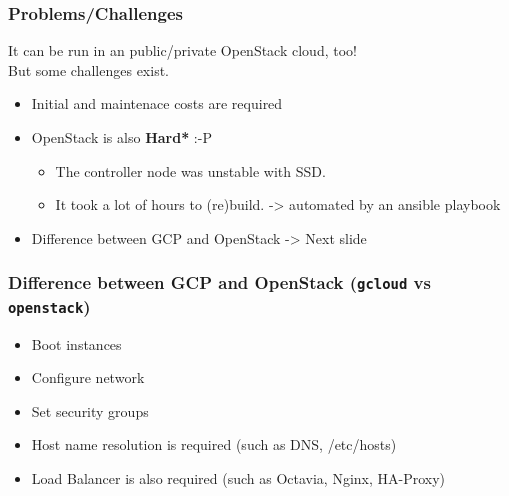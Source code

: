 \documentclass[aspectratio=169,11pt,hyperref={colorlinks=true}]{beamer}
\begin{document}
\begin{frame}
  \frametitle{Problems/Challenges}
  It can be run in an public/private OpenStack cloud, too! \\
  But some challenges exist.
  \begin{itemize}
    \item Initial and maintenace costs are required
    \item OpenStack is also {\bf *Hard*} :-P
      \begin{itemize}
        \item The controller node was unstable with SSD.
        \item It took a lot of hours to (re)build. -> automated by an ansible playbook
      \end{itemize}
    \item Difference between GCP and OpenStack -> Next slide
  \end{itemize}
\end{frame}

\begin{frame}
  \frametitle{Difference between GCP and OpenStack ({\tt gcloud} vs {\tt openstack})}
  \begin{itemize}
    \item Boot instances
    \item Configure network
    \item Set security groups
    \item Host name resolution is required (such as DNS, /etc/hosts)
    \item Load Balancer is also required (such as Octavia, Nginx, HA-Proxy)
  \end{itemize}
\end{frame}
\end{document}

